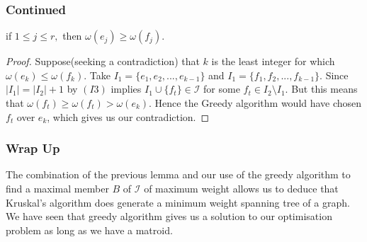 \documentclass{beamer}
\begin{document}
\begin{frame}
\frametitle{Continued}
\begin{lemma}
if $1 \leq j \leq r,$ then $\omega(e_j) \geq \omega(f_j).$
\end{lemma}
\begin{proof}
Suppose(seeking a contradiction) that $k$ is the least integer for which $\omega(e_k) \leq \omega(f_k).$ Take $I_1 = \{e_1, e_2, ..., e_{k-1}\}$ and $I_1 = \{f_1, f_2, ..., f_{k-1}\}.$ Since $|I_1| = |I_2|+1$ by $(I3)$ implies $I_1 \cup \{f_t\} \in \mathcal{I}$ for some $f_t \in I_2 \setminus I_1.$ But this means that $\omega(f_t) \geq \omega(f_t) > \omega(e_k).$ Hence the Greedy algorithm would have chosen $f_t$ over $e_k$, which gives us our contradiction.
\end{proof}

\end{frame}

\begin{frame}
\frametitle{Wrap Up}
The combination of the previous lemma and our use of the greedy algorithm to find a maximal member $B$ of $\mathcal{I}$ of maximum weight allows us to deduce that Kruskal's algorithm does generate a minimum weight spanning tree of a graph. \\We have seen that greedy algorithm gives us a solution to our optimisation problem as long as we have a matroid.
\end{frame}
\end{document}
